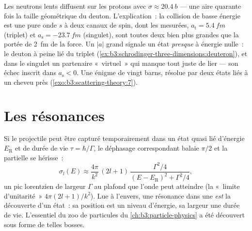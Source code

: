 \begin{example}\label{ex:b3:scattering-theory:np}
Les neutrons lents diffusent sur les protons avec $\sigma \approx
\qty{20.4}{b}$ --- une aire quarante fois la taille géométrique du
deuton. L'explication~: la collision de basse énergie est une pure
onde $s$ à deux canaux de spin, dont les 
mesurées, $a_{\text{t}} = \qty{5.4}{fm}$ (triplet) et $a_{\text{s}} =
\qty{-23.7}{fm}$ (singulet), sont toutes deux bien plus grandes que la
portée de \qty{2}{fm} de la force. Un $|a|$ grand signale un état
\emph{presque} à énergie nulle~: le deuton à peine lié du triplet
(\cref{ex:b3:schrodinger-three-dimensions:deuteron}), et dans le
singulet un partenaire «~virtuel~» qui manque tout juste de lier ---
son échec inscrit dans $a_{\text{s}} < 0$. Une énigme de vingt barns,
résolue par deux états liés à un cheveu près
(\cref{exo:b3:scattering-theory:7}).
\end{example}

\section{Les résonances}

\begin{proposition}\label{prop:b3:scattering-theory:resonance}
Si le projectile peut être capturé temporairement dans un état quasi
lié d'énergie $E_{\text{R}}$ et de durée de vie $\tau = \hbar/\Gamma$,
le déphasage correspondant balaie $\pi/2$ et la 
partielle se hérisse~:
\[
\sigma_l(E) \approx \frac{4\pi}{k^2}\,(2l+1)\,
\frac{\Gamma^2/4}{(E - E_{\text{R}})^2 + \Gamma^2/4} ,
\]
un pic lorentzien de largeur $\Gamma$ au plafond que l'onde peut
atteindre (la «~limite d'unitarité~» $4\pi(2l+1)/k^2$). Lue à
l'envers, une résonance dans une  \emph{est} la
découverte d'un état~: sa position est un niveau d'énergie, sa largeur
une durée de vie. L'essentiel du zoo de particules du
\cref{ch:b3:particle-physics} a été découvert sous forme de telles
bosses.
\end{proposition}
\admitted


